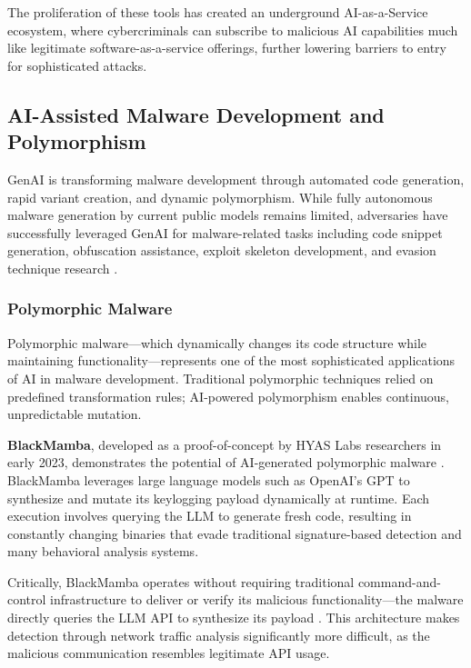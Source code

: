 The proliferation of these tools has created an underground AI-as-a-Service ecosystem, where cybercriminals can subscribe to malicious AI capabilities much like legitimate software-as-a-service offerings, further lowering barriers to entry for sophisticated attacks.

\subsection{AI-Assisted Malware Development and Polymorphism}

GenAI is transforming malware development through automated code generation, rapid variant creation, and dynamic polymorphism. While fully autonomous malware generation by current public models remains limited, adversaries have successfully leveraged GenAI for malware-related tasks including code snippet generation, obfuscation assistance, exploit skeleton development, and evasion technique research \cite{barracuda2024}.

\subsubsection{Polymorphic Malware}

Polymorphic malware---which dynamically changes its code structure while maintaining functionality---represents one of the most sophisticated applications of AI in malware development. Traditional polymorphic techniques relied on predefined transformation rules; AI-powered polymorphism enables continuous, unpredictable mutation.

\textbf{BlackMamba}, developed as a proof-of-concept by HYAS Labs researchers in early 2023, demonstrates the potential of AI-generated polymorphic malware \cite{hyas2023}. BlackMamba leverages large language models such as OpenAI's GPT to synthesize and mutate its keylogging payload dynamically at runtime. Each execution involves querying the LLM to generate fresh code, resulting in constantly changing binaries that evade traditional signature-based detection and many behavioral analysis systems.

Critically, BlackMamba operates without requiring traditional command-and-control infrastructure to deliver or verify its malicious functionality---the malware directly queries the LLM API to synthesize its payload \cite{hyas2023}. This architecture makes detection through network traffic analysis significantly more difficult, as the malicious communication resembles legitimate API usage.

